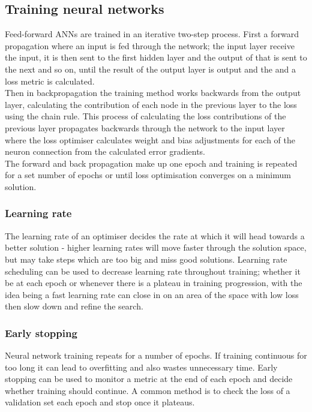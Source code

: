 \documentclass[
    author={Kai Hulme},
    supervisor={Dr Jon Bird},
    degree={BSc},
    title={Generative Adversarial Networks as an Augmentation Technique},
    subtitle={for Alzheimer's Disease Detection in MRI Volumes},
    type={Research},
    year={2021} 
]{dissertation}
\begin{document}
\subsection{Training neural networks}

Feed-forward ANNs are trained in an iterative two-step process. First a forward propagation where an input is fed through the network; the input layer receive the input, it is then sent to the first hidden layer and the output of that is sent to the next and so on, until the result of the output layer is output and the and a loss metric is calculated. \\

Then in backpropagation the training method works backwards from the output layer, calculating the contribution of each node in the previous layer to the loss using the chain rule. This process of calculating the loss contributions of the previous layer propagates backwards through the network to the input layer where the loss optimiser calculates weight and bias adjustments for each of the neuron connection from the calculated error gradients. \\

The forward and back propagation make up one epoch and training is repeated for a set number of epochs or until loss optimisation converges on a minimum solution.

\subsubsection{Learning rate}

The learning rate of an optimiser decides the rate at which it will head towards a better solution - higher learning rates will move faster through the solution space, but may take steps which are too big and miss good solutions. Learning rate scheduling can be used to decrease learning rate throughout training; whether it be at each epoch or whenever there is a plateau in training progression, with the idea being a fast learning rate can close in on an area of the space with low loss then slow down and refine the search.

\subsubsection{Early stopping}

Neural network training repeats for a number of epochs. If training continuous for too long it can lead to overfitting and also wastes unnecessary time. Early stopping can be used to monitor a metric at the end of each epoch and decide whether training should continue. A common method is to check the loss of a validation set each epoch and stop once it plateaus.
	
\end{document}
